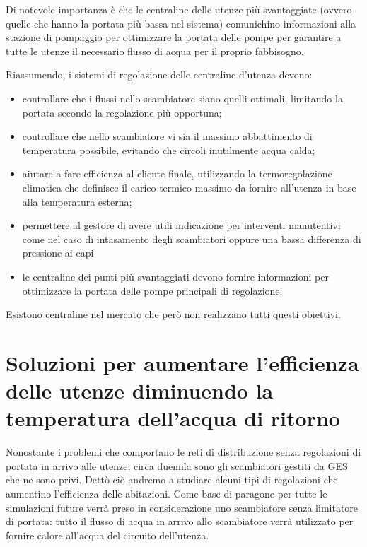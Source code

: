 \documentclass[laurea,oneside,11pt]{USiena_tesiLM}
\begin{document}
Di notevole importanza è che le centraline delle utenze più svantaggiate (ovvero quelle che hanno la portata più bassa nel sistema) comunichino informazioni alla stazione di pompaggio per ottimizzare la portata delle pompe per garantire a tutte le utenze il necessario flusso di acqua per il proprio fabbisogno. 



Riassumendo, i sistemi di regolazione delle centraline d'utenza devono:
\begin{itemize}
\item controllare che i flussi nello scambiatore siano quelli ottimali, limitando la portata secondo la regolazione più opportuna;
\item controllare che nello scambiatore vi sia il massimo abbattimento di temperatura possibile, evitando che circoli inutilmente acqua calda;
\item aiutare a fare efficienza al cliente finale, utilizzando la termoregolazione climatica che definisce il carico termico massimo da fornire all'utenza in base alla temperatura esterna;
\item permettere al gestore di avere utili indicazione per interventi manutentivi come nel caso di intasamento degli scambiatori oppure una bassa differenza di pressione ai capi
\item le centraline dei punti più svantaggiati devono fornire informazioni per ottimizzare la portata delle pompe principali di regolazione.
\end{itemize}

Esistono centraline nel mercato che però non realizzano tutti questi obiettivi.

\section{Soluzioni per aumentare l'efficienza delle utenze diminuendo la temperatura dell'acqua di ritorno}
Nonostante i problemi che comportano le reti di distribuzione senza regolazioni di portata in arrivo alle utenze, circa duemila sono gli scambiatori gestiti da GES che ne sono privi.
Dettò ciò andremo a studiare alcuni tipi di regolazioni che aumentino l'efficienza delle abitazioni. 
Come base di paragone per tutte le simulazioni future verrà preso in considerazione uno scambiatore senza limitatore di portata: tutto il flusso di acqua in arrivo allo scambiatore verrà utilizzato per fornire calore all'acqua del circuito dell'utenza. 
\end{document}
